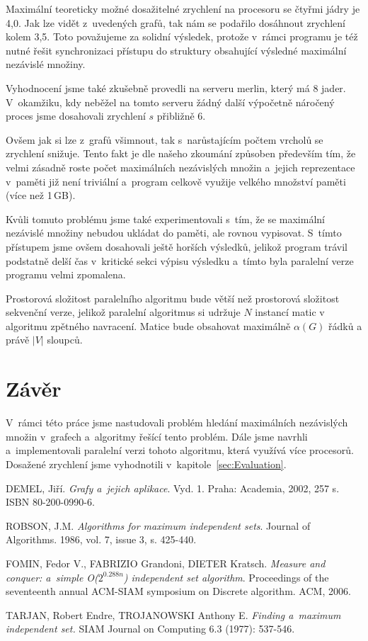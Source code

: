 \documentclass[12pt]{article}
\begin{document}
Maximální teoreticky možné dosažitelné zrychlení na procesoru se čtyřmi jádry je 4,0. Jak lze vidět z~uvedených grafů, tak nám se podařilo dosáhnout zrychlení kolem 3,5. Toto považujeme za solidní výsledek, protože v~rámci programu je též nutné řešit synchronizaci přístupu do struktury obsahující výsledné maximální nezávislé množiny.

Vyhodnocení jsme také zkušebně provedli na serveru merlin, který má 8 jader. V~okamžiku, kdy neběžel na tomto serveru žádný další výpočetně náročený proces jsme dosahovali zrychlení $s$ přibližně 6.  

Ovšem jak si lze z~grafů všimnout, tak s~narůstajícím počtem vrcholů se zrychlení snižuje. Tento fakt je dle našeho zkoumání způsoben především tím, že velmi zásadně roste počet maximálních nezávislých množin a~jejich reprezentace v~paměti již není triviální a~program celkově využije velkého množství paměti (více než 1\,GB). 

Kvůli tomuto problému jsme také experimentovali s~tím, že se maximální nezávislé množiny nebudou ukládat do paměti, ale rovnou vypisovat. S~tímto přístupem jsme ovšem dosahovali ještě horších výsledků, jelikož program trávil podstatně delší čas v~kritické sekci výpisu výsledku a~tímto byla paralelní verze programu velmi zpomalena. 

Prostorová složitost paralelního algoritmu bude větší než prostorová složitost sekvenční verze, jelikož paralelní algoritmus si udržuje $N$ instancí matic v algoritmu zpětného navracení. Matice bude obsahovat maximálně $\alpha(G)$ řádků a právě $|V|$ sloupců.

\section{Závěr}
V~rámci této práce jsme nastudovali problém hledání maximálních nezávislých množin v~grafech a~algoritmy řešící tento problém. Dále jsme navrhli a~implementovali paralelní verzi tohoto algoritmu, která využívá více procesorů. Dosažené zrychlení jsme vyhodnotili v~kapitole~\ref{sec:Evaluation}.


\begin{thebibliography}{99}

    DEMEL, Jiří. \emph{Grafy a~jejich aplikace}. Vyd. 1. Praha: Academia, 2002, 257 s. ISBN 80-200-0990-6.

ROBSON, J.M. \emph{Algorithms for maximum independent sets}. Journal of Algorithms. 1986, vol. 7, issue 3, s. 425-440.

  FOMIN, Fedor V., FABRIZIO Grandoni, DIETER Kratsch.
  \emph{Measure and conquer: a~simple O($2^{0.288n}$) independent set algorithm}.
  Proceedings of the seventeenth annual ACM-SIAM symposium on Discrete algorithm.
   ACM, 2006.

  TARJAN, Robert Endre, TROJANOWSKI Anthony E.
  \emph{Finding a~maximum independent set.}
  SIAM Journal on Computing 6.3 (1977): 537-546.

\end{thebibliography}
\end{document}
